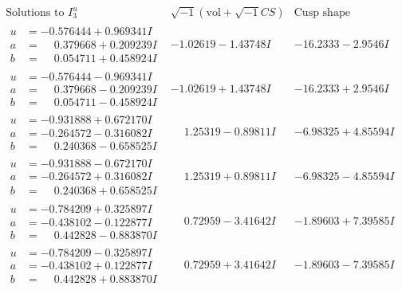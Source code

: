 \documentclass[1p]{elsarticle_modified}
\theoremstyle{definition}
\newcommand{\I}{\sqrt{-1}}
\begin{document}
$$\begin{array}{c|c|c}  
\text{Solutions to }I^u_{3}& \I (\text{vol} + \sqrt{-1}CS) & \text{Cusp shape}\\
 \hline 
\begin{aligned}
u &= -0.576444 + 0.969341 I \\
a &= \phantom{-}0.379668 + 0.209239 I \\
b &= \phantom{-}0.054711 + 0.458924 I\end{aligned}
 & -1.02619 - 1.43748 I & -16.2333 - 2.9546 I \\ \hline\begin{aligned}
u &= -0.576444 - 0.969341 I \\
a &= \phantom{-}0.379668 - 0.209239 I \\
b &= \phantom{-}0.054711 - 0.458924 I\end{aligned}
 & -1.02619 + 1.43748 I & -16.2333 + 2.9546 I \\ \hline\begin{aligned}
u &= -0.931888 + 0.672170 I \\
a &= -0.264572 - 0.316082 I \\
b &= \phantom{-}0.240368 - 0.658525 I\end{aligned}
 & \phantom{-}1.25319 - 0.89811 I & -6.98325 + 4.85594 I \\ \hline\begin{aligned}
u &= -0.931888 - 0.672170 I \\
a &= -0.264572 + 0.316082 I \\
b &= \phantom{-}0.240368 + 0.658525 I\end{aligned}
 & \phantom{-}1.25319 + 0.89811 I & -6.98325 - 4.85594 I \\ \hline\begin{aligned}
u &= -0.784209 + 0.325897 I \\
a &= -0.438102 - 0.122877 I \\
b &= \phantom{-}0.442828 - 0.883870 I\end{aligned}
 & \phantom{-}0.72959 - 3.41642 I & -1.89603 + 7.39585 I \\ \hline\begin{aligned}
u &= -0.784209 - 0.325897 I \\
a &= -0.438102 + 0.122877 I \\
b &= \phantom{-}0.442828 + 0.883870 I\end{aligned}
 & \phantom{-}0.72959 + 3.41642 I & -1.89603 - 7.39585 I \\ \hline\begin{aligned}

\end{aligned}
\end{array}$$
\end{document}
